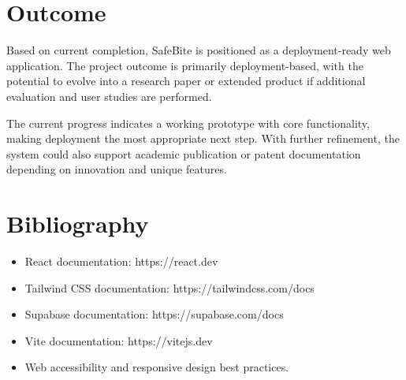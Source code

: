 \documentclass[12pt,a4paper]{report}
\begin{document}
\chapter{Outcome}
Based on current completion, SafeBite is positioned as a deployment-ready web application. The project outcome is primarily deployment-based, with the potential to evolve into a research paper or extended product if additional evaluation and user studies are performed.

The current progress indicates a working prototype with core functionality, making deployment the most appropriate next step. With further refinement, the system could also support academic publication or patent documentation depending on innovation and unique features.

\chapter{Bibliography}
\begin{itemize}
  \item React documentation: https://react.dev
  \item Tailwind CSS documentation: https://tailwindcss.com/docs
  \item Supabase documentation: https://supabase.com/docs
  \item Vite documentation: https://vitejs.dev
  \item Web accessibility and responsive design best practices.
\end{itemize}
\end{document}
